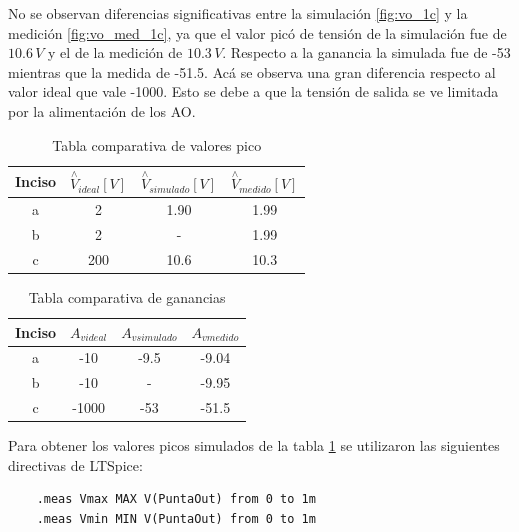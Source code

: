 \documentclass[10pt,spanish,a4paper,openany,notitlepage]{article}
\begin{document}
\begin{enumerate}
\begin{enumerate}
    
    No se observan diferencias significativas entre la simulación \ref{fig:vo_1c} y la medición \ref{fig:vo_med_1c}, ya que el valor picó de tensión de la simulación fue de $10.6\,\unit{V}$ y el de la medición de $10.3\,\unit{V}$. Respecto a la ganancia la simulada fue de -53 mientras que la medida de -51.5. Acá se observa una gran diferencia respecto al valor ideal que vale -1000. Esto se debe a que la tensión de salida se ve limitada por la alimentación de los AO.
    
    \begin{table}[H]
    \centering
    \begin{tabular}{|c|c|c|c|} %
    \hline
    Inciso & $\overset{\wedge}{V}_{ideal} [\unit{V}]$ & $\overset{\wedge}{V}_{simulado}[\unit{V}]$ &  $\overset{\wedge}{V}_{medido}[\unit{V}]$ \\ \hline
    a & 2 & 1.90 & 1.99 \\ \hline
    b & 2 & - & 1.99 \\ \hline
    c & 200  & 10.6 & 10.3 \\ \hline
    \end{tabular}
    \caption{Tabla comparativa de valores pico}
    \label{table:tabla_vpico}
    \end{table}
    
    \begin{table}[H]
    \centering
    \begin{tabular}{|c|c|c|c|} %
    \hline
    Inciso & ${A}_{videal}$ & ${A}_{vsimulado}$ &  ${A}_{vmedido}$  \\ \hline
    a & -10 & -9.5  & -9.04  \\ \hline
    b & -10 & - & -9.95 \\ \hline
    c & -1000 & -53 & -51.5 \\ \hline
    \end{tabular}
    \caption{Tabla comparativa de ganancias}
    \label{table:tabla_ganancia}
    \end{table}

    
    Para obtener los valores picos simulados de la tabla \ref{table:tabla_vpico} se utilizaron las siguientes directivas de LTSpice:
    
    \begin{verbatim}
    .meas Vmax MAX V(PuntaOut) from 0 to 1m
    .meas Vmin MIN V(PuntaOut) from 0 to 1m
    \end{verbatim}


\end{enumerate}
\end{enumerate}
\end{document}

